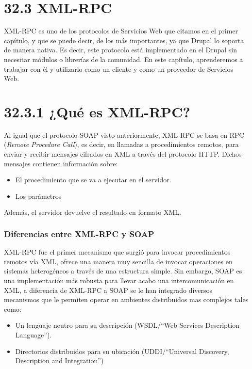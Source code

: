 \section{\Huge{32.3 XML-RPC}}

XML-RPC es uno de los protocolos de Servicios Web que citamos en el primer capítulo, y que se puede decir, 
de los más importantes, ya que Drupal lo soporta de manera nativa. Es decir, este protocolo está implementado 
en el Drupal sin necesitar módulos o librerías de la comunidad. En este capítulo, aprenderemos a trabajar con él 
y utilizarlo como un cliente y como un proveedor de Servicios Web.

\section{\Large{32.3.1 ¿Qué es XML-RPC?}}

Al igual que el protocolo SOAP visto anteriormente, XML-RPC se basa en RPC (\textit{Remote Procedure Call}), es decir, 
en llamadas a procedimientos remotos, para enviar y recibir mensajes cifrados en XML a través del protocolo HTTP.
Dichos mensajes contienen información sobre:

\begin{itemize}
  \item El procedimiento que se va a ejecutar en el servidor.
  \item Los parámetros
\end{itemize} 

Además, el servidor devuelve el resultado en formato XML.

\subsubsection{\large{Diferencias entre XML-RPC y SOAP}}

XML-RPC fue el primer mecanismo que surgió para invocar procedimientos remotos vía XML, ofrece una manera 
muy sencilla de invocar operaciones en sistemas heterogéneos a través de una estructura simple. Sin embargo, 
SOAP es una implementación más robusta para llevar acabo una intercomunicación en XML, a diferencia de XML-RPC 
a SOAP se le han integrado diversos mecanismos que le permiten operar en ambientes distribuidos mas complejos tales 
como:

\begin{itemize}
  \item Un lenguaje neutro para su descripción (WSDL/``Web Services Description Language'').
  \item Directorios distribuidos para su ubicación (UDDI/``Universal Discovery, Description and Integration'')  
\end{itemize} 

